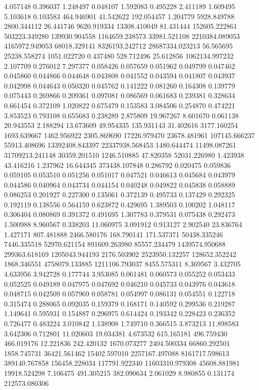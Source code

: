 4.057148
0.396037
1.248497
0.048107
1.592083
0.495228
2.411189
1.609495
5.103618
0.103583
464.946901
41.542622
192.054457
1.204779
5928.849788
2800.344112
26.441746
9620.919334
13308.410049
81.431444
152605.222861
503223.349280
139930.904558
1164659.238573
33981.521108
2210384.089053
4165972.949053
68018.329141
8326193.242712
28687334.023213
56.565695
25238.558274
1051.022720
0.437480
528.712496
25.612856
1062134.997232
2.107709
0.276012
7.297377
0.058426
0.057659
0.051962
0.049799
0.047462
0.045860
0.044866
0.044648
0.043808
0.041552
0.043594
0.041807
0.043937
0.042998
0.044643
0.050320
0.045762
0.141222
0.081260
0.164308
0.139779
0.075443
0.269866
0.209361
0.097081
0.086569
0.061683
0.239381
0.328634
0.661454
0.372109
1.020822
0.675479
0.153583
3.084506
0.254870
0.474221
3.853523
0.793108
0.655683
0.238289
2.875809
19.967267
8.601670
0.061138
20.943553
2.188294
13.673609
49.954335
135.931143
31.402616
3177.160254
1693.639667
1462.956922
2305.869690
17226.979470
23678.481961
107145.666237
55913.408696
13392408.843397
22337938.568453
1480.644474
11498.087261
31709213.241148
30359.201510
1246.510885
47.820358
52031.226980
1.423938
43.416216
1.237962
16.644345
373438.107848
0.286792
0.020475
0.059836
0.059105
0.053510
0.051256
0.051017
0.047521
0.046613
0.045684
0.043979
0.044586
0.040964
0.043734
0.044154
0.040248
0.049822
0.045838
0.058889
0.086253
0.201927
0.227300
0.135061
0.372139
0.495733
0.137429
0.292325
0.192119
0.138556
0.564159
0.623872
0.429695
1.389503
0.100202
1.048117
0.306404
0.080869
0.391372
0.491695
1.307783
0.379531
0.075438
0.292473
1.500988
8.960567
0.338203
11.060975
3.091912
0.913127
2.902540
23.836764
1.427171
807.481888
2466.580176
168.790141
171.537371
50438.335246
7446.335518
52970.621154
891609.263980
85557.234479
1439574.950688
299363.618169
1205043.944193
2176.503902
2523950.132257
128652.352242
1868.346551
4758079.133885
1211106.793037
8455.575311
8.369567
3.432705
4.633956
3.942728
0.177744
3.953085
0.061481
0.060573
0.055252
0.053433
0.052525
0.049189
0.047975
0.047692
0.046210
0.045733
0.043976
0.043618
0.048715
0.042509
0.057969
0.058781
0.054997
0.086131
0.054551
0.122718
0.315474
0.288065
0.092035
0.159379
0.168171
0.140592
0.299536
0.219287
1.149641
0.595931
0.154887
0.296975
0.614424
0.193342
0.228423
0.236352
0.726477
0.483224
3.010842
1.138908
1.749710
0.366515
3.873213
11.898583
3.642306
0.712801
11.020603
19.034381
4.673532
615.165181
496.759430
466.019176
12.221836
242.420132
1670.073277
2404.500334
66860.292501
1858.745731
36421.561462
15402.597010
2257167.497088
8161717.598613
389140.767858
156458.228034
117791.922340
11603310.979308
45608.881981
19918.524298
7.106475
491.305215
382.090634
2.061029
8.980855
0.131174
212573.080306
